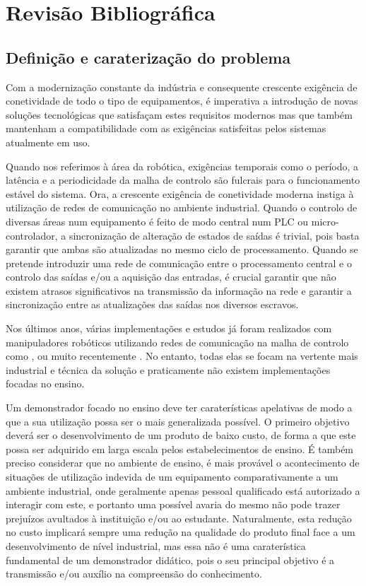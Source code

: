 \chapter{Revisão Bibliográfica} \label{chap:sota}


\section{Definição e caraterização do problema}\label{sec:problem}

Com a modernização constante da indústria e consequente crescente exigência
de conetividade de todo o tipo de equipamentos, é imperativa a introdução
de novas soluções tecnológicas que satisfaçam estes requisitos modernos
mas que também mantenham a compatibilidade com as exigências satisfeitas
pelos sistemas atualmente em uso.

Quando nos referimos à área da robótica, exigências temporais como o
período, a latência e a periodicidade da malha de controlo são fulcrais
para o funcionamento estável do sistema. Ora, a crescente exigência de
conetividade moderna instiga à utilização de redes de comunicação no
ambiente industrial. Quando o controlo de diversas áreas num equipamento
é feito de modo central num PLC ou micro-controlador, a sincronização de
alteração de estados de saídas é trivial, pois basta garantir que ambas
são atualizadas no mesmo ciclo de processamento. Quando se pretende
introduzir uma rede de comunicação entre o processamento central e o
controlo das saídas e/ou a aquisição das entradas, é crucial garantir
que não existem atrasos significativos na transmissão da informação
na rede e garantir a sincronização entre as atualizações das saídas
nos diversos escravos.

Nos últimos anos, várias implementações e estudos já foram realizados
com manipuladores robóticos utilizando redes de comunicação na malha de
controlo como \cite{Zhang18}, \cite{leiwang2010} ou muito recentemente
\cite{deremetz2020}. No entanto, todas elas se focam na vertente mais
industrial e técnica da solução e praticamente não existem implementações
focadas no ensino.

Um demonstrador focado no ensino deve ter caraterísticas apelativas de
modo a que a sua utilização possa ser o mais generalizada possível. O
primeiro objetivo deverá ser o desenvolvimento de um produto de baixo
custo, de forma a que este possa ser adquirido em larga escala pelos
estabelecimentos de ensino. É também preciso considerar que no ambiente
de ensino, é mais provável o acontecimento de situações de utilização
indevida de um equipamento comparativamente a um ambiente industrial,
onde geralmente apenas pessoal qualificado está autorizado a interagir
com este, e portanto uma possível avaria do mesmo não pode trazer
prejuízos avultados à instituição e/ou ao estudante. Naturalmente, esta
redução no custo implicará sempre uma redução na qualidade do produto
final face a um desenvolvimento de nível industrial, mas essa não é uma
caraterística fundamental de um demonstrador didático, pois o seu principal
objetivo é a transmissão e/ou auxílio na compreensão do conhecimento.

